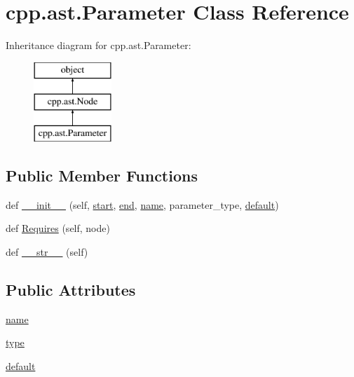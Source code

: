 \hypertarget{classcpp_1_1ast_1_1_parameter}{}\section{cpp.\+ast.\+Parameter Class Reference}
\label{classcpp_1_1ast_1_1_parameter}
Inheritance diagram for cpp.\+ast.\+Parameter\+:\begin{figure}[H]
\begin{center}
\leavevmode
\includegraphics[height=3.000000cm]{d7/d7a/classcpp_1_1ast_1_1_parameter}
\end{center}
\end{figure}
\subsection*{Public Member Functions}
\begin{DoxyCompactItemize}
\item 
def \mbox{\hyperlink{classcpp_1_1ast_1_1_parameter_a4fe27f559d44adac9e9b5898ba76c5b3}{\+\_\+\+\_\+init\+\_\+\+\_\+}} (self, \mbox{\hyperlink{classcpp_1_1ast_1_1_node_a7b2aa97e6a049bb1a93aea48c48f1f44}{start}}, \mbox{\hyperlink{classcpp_1_1ast_1_1_node_a3c5e5246ccf619df28eca02e29d69647}{end}}, \mbox{\hyperlink{classcpp_1_1ast_1_1_parameter_aae0375fb0ded8fa9090feea6bdff2784}{name}}, parameter\+\_\+type, \mbox{\hyperlink{classcpp_1_1ast_1_1_parameter_a4ceae2ac87d82c5542c4e7385eb4c97e}{default}})
\item 
def \mbox{\hyperlink{classcpp_1_1ast_1_1_parameter_a4bc5c17a0d606d35be40cb4c2c1a67a6}{Requires}} (self, node)
\item 
def \mbox{\hyperlink{classcpp_1_1ast_1_1_parameter_aabfbabb3c744a0da4a012ceb4299947a}{\+\_\+\+\_\+str\+\_\+\+\_\+}} (self)
\end{DoxyCompactItemize}
\subsection*{Public Attributes}
\begin{DoxyCompactItemize}
\item 
\mbox{\hyperlink{classcpp_1_1ast_1_1_parameter_aae0375fb0ded8fa9090feea6bdff2784}{name}}
\item 
\mbox{\hyperlink{classcpp_1_1ast_1_1_parameter_a5eed090000c41551a10c21f175ad33e3}{type}}
\item 
\mbox{\hyperlink{classcpp_1_1ast_1_1_parameter_a4ceae2ac87d82c5542c4e7385eb4c97e}{default}}
\end{DoxyCompactItemize}


